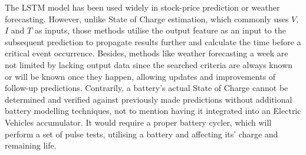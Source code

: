%
%
The LSTM model has been used widely in stock-price prediction or weather forecasting.
However, unlike State of Charge estimation, which commonly uses $V$, $I$ and $T$ as inputs, those methods utilise the output feature as an input to the subsequent prediction to propagate results further and calculate the time before a critical event occurrence.
Besides, methods like weather forecasting a week are not limited by lacking output data since the searched criteria are always known or will be known once they happen, allowing updates and improvements of follow-up predictions.
Contrarily, a battery's actual State of Charge cannot be determined and verified against previously made predictions without additional battery modelling techniques, not to mention having it integrated into an Electric Vehicles accumulator.
It would require a proper battery cycler, which will perform a set of pulse tests, utilising a battery and affecting its' charge and remaining life.

